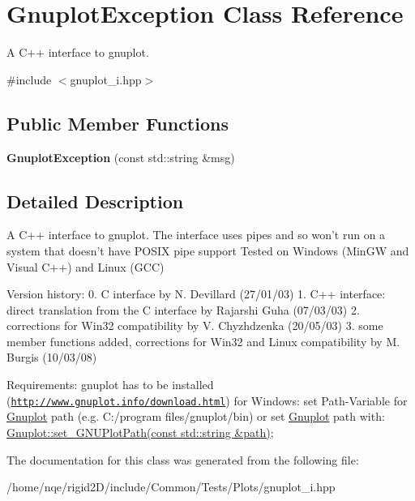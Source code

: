 \hypertarget{class_gnuplot_exception}{
\section{GnuplotException Class Reference}
\label{class_gnuplot_exception}
}


A C++ interface to gnuplot.  




{\ttfamily \#include $<$gnuplot\_\-i.hpp$>$}

\subsection*{Public Member Functions}
\begin{DoxyCompactItemize}
\item 
\hypertarget{class_gnuplot_exception_a8b324a9ef4d3f75079d41ecd61c62d44}{
{\bfseries GnuplotException} (const std::string \&msg)}
\label{class_gnuplot_exception_a8b324a9ef4d3f75079d41ecd61c62d44}

\end{DoxyCompactItemize}


\subsection{Detailed Description}
A C++ interface to gnuplot. The interface uses pipes and so won't run on a system that doesn't have POSIX pipe support Tested on Windows (MinGW and Visual C++) and Linux (GCC)

Version history: 0. C interface by N. Devillard (27/01/03) 1. C++ interface: direct translation from the C interface by Rajarshi Guha (07/03/03) 2. corrections for Win32 compatibility by V. Chyzhdzenka (20/05/03) 3. some member functions added, corrections for Win32 and Linux compatibility by M. Burgis (10/03/08)

Requirements: gnuplot has to be installed (\href{http://www.gnuplot.info/download.html}{\tt http://www.gnuplot.info/download.html}) for Windows: set Path-\/Variable for \hyperlink{class_gnuplot}{Gnuplot} path (e.g. C:/program files/gnuplot/bin) or set \hyperlink{class_gnuplot}{Gnuplot} path with: \hyperlink{class_gnuplot_a67cae885c26ced821e335d98986f1967}{Gnuplot::set\_\-GNUPlotPath(const std::string \&path)}; 

The documentation for this class was generated from the following file:\begin{DoxyCompactItemize}
\item 
/home/nqe/rigid2D/include/Common/Tests/Plots/gnuplot\_\-i.hpp\end{DoxyCompactItemize}
